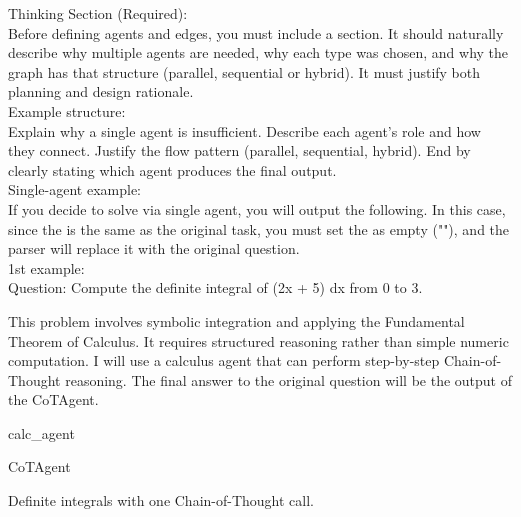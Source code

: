 \begin{userprompt}[title={User Prompt}]
Thinking Section (Required):\\

Before defining agents and edges, you must include a  section.
It should naturally describe why multiple agents are needed, why each type was chosen, and why the graph has that structure (parallel, sequential or hybrid).
It must justify both planning and design rationale.\\

Example structure:\\

  Explain why a single agent is insufficient.
  Describe each agent's role and how they connect.
  Justify the flow pattern (parallel, sequential, hybrid).
  End by clearly stating which agent produces the final output.
\\

Single-agent example:\\

If you decide to solve via single agent, you will output the following. In this case, since the  is the same as the original task, you must set the  as empty (""), and the parser will replace it with the original question.\\

1st example:\\

Question: Compute the definite integral of (2x + 5) dx from 0 to 3.\\


This problem involves symbolic integration and applying the Fundamental Theorem of Calculus.
It requires structured reasoning rather than simple numeric computation.
I will use a calculus agent that can perform step-by-step Chain-of-Thought reasoning.
The final answer to the original question will be the output of the CoTAgent.



\quad{}calc\_agent

\quad{}CoTAgent

\quad{}
Definite integrals with one Chain-of-Thought call.

\quad{}

\qquad{}


\end{userprompt}

